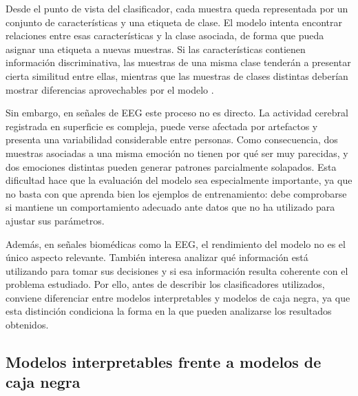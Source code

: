 Desde el punto de vista del clasificador, cada muestra queda representada por un conjunto de características y una etiqueta de clase. El modelo intenta encontrar relaciones entre esas características y la clase asociada, de forma que pueda asignar una etiqueta a nuevas muestras. Si las características contienen información discriminativa, las muestras de una misma clase tenderán a presentar cierta similitud entre ellas, mientras que las muestras de clases distintas deberían mostrar diferencias aprovechables por el modelo \cite{lotte2007classification}.

Sin embargo, en señales de \ac{EEG} este proceso no es directo. La actividad cerebral registrada en superficie es compleja, puede verse afectada por artefactos y presenta una variabilidad considerable entre personas. Como consecuencia, dos muestras asociadas a una misma emoción no tienen por qué ser muy parecidas, y dos emociones distintas pueden generar patrones parcialmente solapados. Esta dificultad hace que la evaluación del modelo sea especialmente importante, ya que no basta con que aprenda bien los ejemplos de entrenamiento: debe comprobarse si mantiene un comportamiento adecuado ante datos que no ha utilizado para ajustar sus parámetros.

Además, en señales biomédicas como la \ac{EEG}, el rendimiento del modelo no es el único aspecto relevante. También interesa analizar qué información está utilizando para tomar sus decisiones y si esa información resulta coherente con el problema estudiado. Por ello, antes de describir los clasificadores utilizados, conviene diferenciar entre modelos interpretables y modelos de caja negra, ya que esta distinción condiciona la forma en la que pueden analizarse los resultados obtenidos.


\subsection{Modelos interpretables frente a modelos de caja negra}


